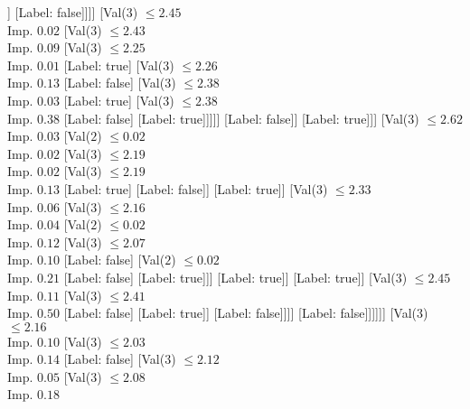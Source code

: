 \documentclass[margin=10pt]{standalone}
\begin{document}
\begin{forest}
																	]
																[Label: false]]]]
													[Val($3$) $ \leq 2.45$ \\ Imp. $0.02$
														[Val($3$) $ \leq 2.43$ \\ Imp. $0.09$
															[Val($3$) $ \leq 2.25$ \\ Imp. $0.01$
																[Label: true]
																[Val($3$) $ \leq 2.26$ \\ Imp. $0.13$
																	[Label: false]
																	[Val($3$) $ \leq 2.38$ \\ Imp. $0.03$
																		[Label: true]
																		[Val($3$) $ \leq 2.38$ \\ Imp. $0.38$
																			[Label: false]
																			[Label: true]]]]]
															[Label: false]]
														[Label: true]]]
												[Val($3$) $ \leq 2.62$ \\ Imp. $0.03$
													[Val($2$) $ \leq 0.02$ \\ Imp. $0.02$
														[Val($3$) $ \leq 2.19$ \\ Imp. $0.02$
															[Val($3$) $ \leq 2.19$ \\ Imp. $0.13$
																[Label: true]
																[Label: false]]
															[Label: true]]
														[Val($3$) $ \leq 2.33$ \\ Imp. $0.06$
															[Val($3$) $ \leq 2.16$ \\ Imp. $0.04$
																[Val($2$) $ \leq 0.02$ \\ Imp. $0.12$
																	[Val($3$) $ \leq 2.07$ \\ Imp. $0.10$
																		[Label: false]
																		[Val($2$) $ \leq 0.02$ \\ Imp. $0.21$
																			[Label: false]
																			[Label: true]]]
																	[Label: true]]
																[Label: true]]
															[Val($3$) $ \leq 2.45$ \\ Imp. $0.11$
																[Val($3$) $ \leq 2.41$ \\ Imp. $0.50$
																	[Label: false]
																	[Label: true]]
																[Label: false]]]]
													[Label: false]]]]]]
								[Val($3$) $ \leq 2.16$ \\ Imp. $0.10$
									[Val($3$) $ \leq 2.03$ \\ Imp. $0.14$
										[Label: false]
										[Val($3$) $ \leq 2.12$ \\ Imp. $0.05$
											[Val($3$) $ \leq 2.08$ \\ Imp. $0.18$

\end{forest}
\end{document}
